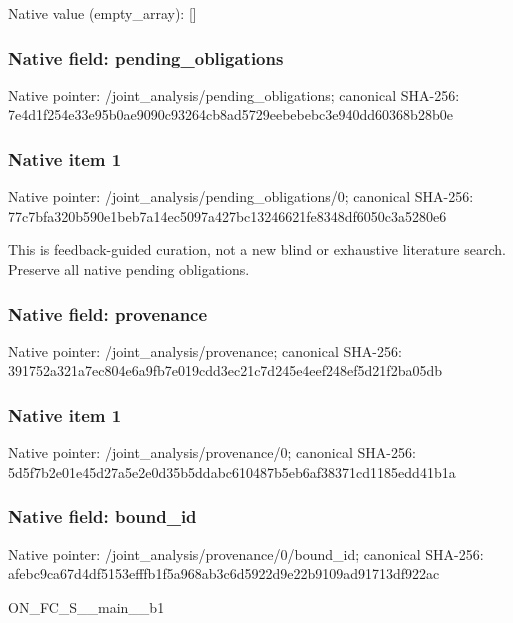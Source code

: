 \documentclass[10pt,a4paper]{article}
\begin{document}
Native value (empty\_\allowbreak{}array): []

\subsubsection{Native field: pending\_\allowbreak{}obligations}
Native pointer: /joint\_\allowbreak{}analysis/pending\_\allowbreak{}obligations; canonical SHA-256: 7e4d1f254e33e95b0ae9090c93264cb8ad5729eebebebc3e940dd60368b28b0e

\subsubsection{Native item 1}
Native pointer: /joint\_\allowbreak{}analysis/pending\_\allowbreak{}obligations/0; canonical SHA-256: 77c7bfa320b590e1beb7a14ec5097a427bc13246621fe8348df6050c3a5280e6

\begingroup\raggedright\sloppy This is feedback-guided curation,\allowbreak{} not a new blind or exhaustive literature search. Preserve all native pending obligations.\par\endgroup

\subsubsection{Native field: provenance}
Native pointer: /joint\_\allowbreak{}analysis/provenance; canonical SHA-256: 391752a321a7ec804e6a9fb7e019cdd3ec21c7d245e4eef248ef5d21f2ba05db

\subsubsection{Native item 1}
Native pointer: /joint\_\allowbreak{}analysis/provenance/0; canonical SHA-256: 5d5f7b2e01e45d27a5e2e0d35b5ddabc610487b5eb6af38371cd1185edd41b1a

\subsubsection{Native field: bound\_\allowbreak{}id}
Native pointer: /joint\_\allowbreak{}analysis/provenance/0/bound\_\allowbreak{}id; canonical SHA-256: afebc9ca67d4df5153efffb1f5a968ab3c6d5922d9e22b9109ad91713df922ac

\begingroup\raggedright\sloppy ON\_\allowbreak{}FC\_\allowbreak{}S\_\allowbreak{}\_\allowbreak{}main\_\allowbreak{}\_\allowbreak{}b1\par\endgroup
\end{document}
